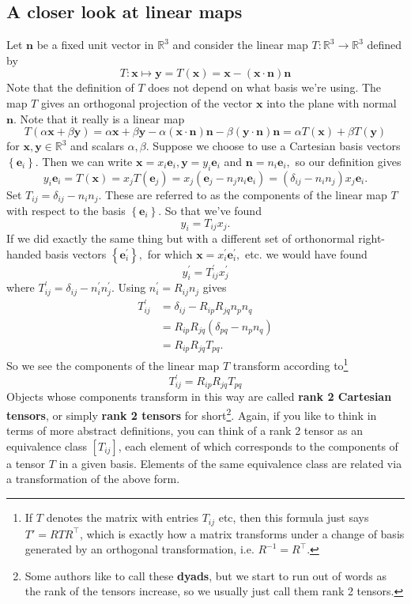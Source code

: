 \subsection{A closer look at linear maps}
Let $\mathbf{n}$ be a fixed unit vector in $\mathbb{R}^{3}$ and consider the linear map $T: \mathbb{R}^{3} \rightarrow \mathbb{R}^{3}$ defined by
\[
T: \mathbf{x} \mapsto \mathbf{y}=T(\mathbf{x})=\mathbf{x}-(\mathbf{x} \cdot \mathbf{n}) \mathbf{n}
\]
Note that the definition of $T$ does not depend on what basis we're using. The map $T$ gives an orthogonal projection of the vector $\mathbf{x}$ into the plane with normal $\mathbf{n}$. Note that it really is a linear map
\[
T(\alpha \mathbf{x}+\beta \mathbf{y})=\alpha \mathbf{x}+\beta \mathbf{y}-\alpha(\mathbf{x} \cdot \mathbf{n}) \mathbf{n}-\beta(\mathbf{y} \cdot \mathbf{n}) \mathbf{n}=\alpha T(\mathbf{x})+\beta T(\mathbf{y})
\]
for $\mathbf{x}, \mathbf{y} \in \mathbb{R}^{3}$ and scalars $\alpha, \beta$. Suppose we choose to use a Cartesian basis vectors $\left\{\mathbf{e}_{i}\right\}$. Then we can write $\mathbf{x}=x_{i} \mathbf{e}_{i}, \mathbf{y}=y_{i} \mathbf{e}_{i}$ and $\mathbf{n}=n_{i} \mathbf{e}_{i},$ so our definition gives
\[
y_{i} \mathbf{e}_{i}=T(\mathbf{x})=x_{j} T\left(\mathbf{e}_{j}\right)=x_{j}\left(\mathbf{e}_{j}-n_{j} n_{i} \mathbf{e}_{i}\right)=\left(\delta_{i j}-n_{i} n_{j}\right) x_{j} \mathbf{e}_{i}.
\]
Set $T_{i j}=\delta_{i j}-n_{i} n_{j} .$ These are referred to as the components of the linear map $T$ with respect to the basis $\left\{\mathbf{e}_{i}\right\}$. So that we've found
\[
y_{i}=T_{i j} x_{j}.
\]
If we did exactly the same thing but with a different set of orthonormal right-handed basis vectors $\left\{\mathbf{e}_{i}^{\prime}\right\},$ for which $\mathbf{x}=x_{i}^{\prime} \mathbf{e}_{i}^{\prime},$ etc. we would have found
\[
y_{i}^{\prime}=T_{i j}^{\prime} x_{j}^{\prime}
\]
where $T_{i j}^{\prime}=\delta_{i j}-n_{i}^{\prime} n_{j}^{\prime} .$ Using $n_{i}^{\prime}=R_{i j} n_{j}$ gives
\[
\begin{aligned}
T_{i j}^{\prime} &=\delta_{i j}-R_{i p} R_{j q} n_{p} n_{q} \\
&=R_{i p} R_{j q}\left(\delta_{p q}-n_{p} n_{q}\right) \\
&=R_{i p} R_{j q} T_{p q}.
\end{aligned}
\]
So we see the components of the linear map $T$ transform according to\footnote{If $T$ denotes the matrix with entries $T_{ij}$ etc, then this
formula just says $ T'=RTR^{\top } $, which is exactly how a matrix transforms under a change of basis generated by an orthogonal transformation, i.e. $ R^{-1}=R^\top $.}
\[
    \boxed{T_{i j}^{\prime}=R_{i p} R_{j q} T_{p q}}
\]
Objects whose components transform in this way are called \textbf{rank 2 Cartesian tensors}, or simply \textbf{rank 2 tensors} for short\footnote{Some authors like to call these \textbf{dyads}, but we start to run out of words as the rank of the tensors increase, so we usually just call them rank 2 tensors.}. Again, if you like to think in terms of more abstract definitions, you can think of a rank 2 tensor as an equivalence class $\left[T_{i j}\right]$, each element of which corresponds to the components of a tensor $T$ in a given basis. Elements of the
same equivalence class are related via a transformation of the above form.

